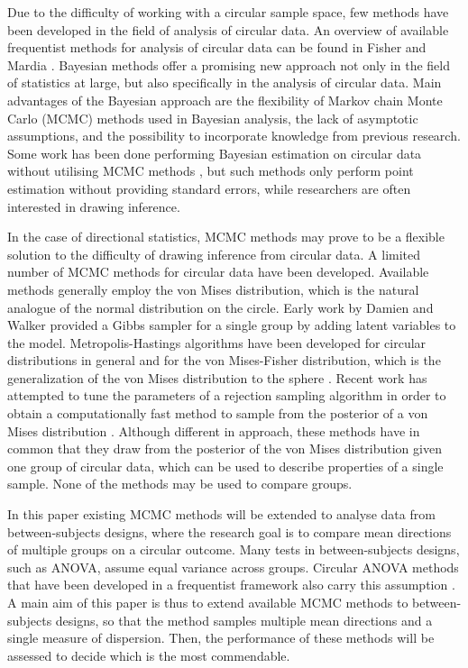 \documentclass[]{gSCS2e}
\theoremstyle{plain}
\theoremstyle{definition}
\theoremstyle{remark}
\begin{document}
Due to the difficulty of working with a circular sample space, few methods have been developed in the field of analysis of circular data. An overview of available frequentist methods for analysis of circular data can be found in Fisher \cite{fisher1995statistical} and Mardia \cite{mardia1999directional}. Bayesian methods offer a promising new approach not only in the field of statistics at large, but also specifically in the analysis of circular data. Main advantages of the Bayesian approach are the flexibility of Markov chain Monte Carlo (MCMC) methods used in Bayesian analysis, the lack of asymptotic assumptions, and the possibility to incorporate knowledge from previous research. Some work has been done performing Bayesian estimation on circular data without utilising MCMC methods \citep{dowe1996bayesian}, but such methods only perform point estimation without providing standard errors, while researchers are often interested in drawing inference. 


In the case of directional statistics, MCMC methods may prove to be a flexible solution to the difficulty of drawing inference from circular data. A limited number of MCMC methods for circular data have been developed. Available methods generally employ the von Mises distribution, which is the natural analogue of the normal distribution on the circle. Early work by Damien and Walker \cite{damien1999fullbayes} provided a Gibbs sampler for a single group by adding latent variables to the model. Metropolis-Hastings algorithms have been developed for circular distributions in general \citep{Bhattacharya2009} and for the von Mises-Fisher distribution, which is the generalization of the von Mises distribution to the sphere \citep{nunez2005bayesian}. Recent work has attempted to tune the parameters of a rejection sampling algorithm in order to obtain a computationally fast method to sample from the posterior of a von Mises distribution \citep{forbes2014fast}. Although different in approach, these methods have in common that they draw from the posterior of the von Mises distribution given one group of circular data, which can be used to describe properties of a single sample. None of the methods may be used to compare groups. 

In this paper existing MCMC methods will be extended to analyse data from between-subjects designs, where the research goal is to compare mean directions of multiple groups on a circular outcome. Many tests in between-subjects designs, such as ANOVA, assume equal variance across groups. Circular ANOVA methods that have been developed in a frequentist framework also carry this assumption \citep{harrison1988development, harrison1986analysis}. A main aim of this paper is thus to extend available MCMC methods to between-subjects designs, so that the method samples multiple mean directions and a single measure of dispersion. Then, the performance of these methods will be assessed to decide which is the most commendable. 
\end{document}
